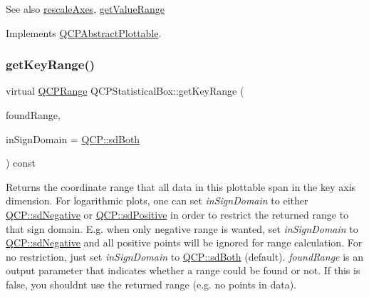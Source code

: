 \begin{DoxySeeAlso}{See also}
\hyperlink{class_q_c_p_abstract_plottable_a1491c4a606bccd2d09e65e11b79eb882}{rescale\+Axes}, \hyperlink{class_q_c_p_statistical_box_ab3388a21d0c2e86fbc0cba9c06ceb49b}{get\+Value\+Range} 
\end{DoxySeeAlso}


Implements \hyperlink{class_q_c_p_abstract_plottable_a4da16d3cd4b509e1104a9b0275623c96}{Q\+C\+P\+Abstract\+Plottable}.

\mbox{\label{class_q_c_p_statistical_box_ae44dd2e135ebf2a53eb6e4bfe7343211}} 
\subsubsection{\texorpdfstring{get\+Key\+Range()}{getKeyRange()}\hspace{0.1cm}{\footnotesize\ttfamily [2/2]}}
{\footnotesize\ttfamily virtual \hyperlink{class_q_c_p_range}{Q\+C\+P\+Range} Q\+C\+P\+Statistical\+Box\+::get\+Key\+Range (\begin{DoxyParamCaption}\item[{bool \&}]{found\+Range,  }\item[{\hyperlink{namespace_q_c_p_afd50e7cf431af385614987d8553ff8a9}{Q\+C\+P\+::\+Sign\+Domain}}]{in\+Sign\+Domain = {\ttfamily \hyperlink{namespace_q_c_p_afd50e7cf431af385614987d8553ff8a9a3dee7e9cd2fedce9253b83e172626a6c}{Q\+C\+P\+::sd\+Both}} }\end{DoxyParamCaption}) const\hspace{0.3cm}{\ttfamily [virtual]}}

Returns the coordinate range that all data in this plottable span in the key axis dimension. For logarithmic plots, one can set {\itshape in\+Sign\+Domain} to either \hyperlink{namespace_q_c_p_afd50e7cf431af385614987d8553ff8a9a0b464fa3135be2808909739a969193c9}{Q\+C\+P\+::sd\+Negative} or \hyperlink{namespace_q_c_p_afd50e7cf431af385614987d8553ff8a9a23362334a52289677a51526a9b68db6c}{Q\+C\+P\+::sd\+Positive} in order to restrict the returned range to that sign domain. E.\+g. when only negative range is wanted, set {\itshape in\+Sign\+Domain} to \hyperlink{namespace_q_c_p_afd50e7cf431af385614987d8553ff8a9a0b464fa3135be2808909739a969193c9}{Q\+C\+P\+::sd\+Negative} and all positive points will be ignored for range calculation. For no restriction, just set {\itshape in\+Sign\+Domain} to \hyperlink{namespace_q_c_p_afd50e7cf431af385614987d8553ff8a9a3dee7e9cd2fedce9253b83e172626a6c}{Q\+C\+P\+::sd\+Both} (default). {\itshape found\+Range} is an output parameter that indicates whether a range could be found or not. If this is false, you shouldn\textquotesingle{}t use the returned range (e.\+g. no points in data).

